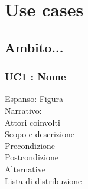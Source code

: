 \section{Use cases }
\subsection{Ambito...}
	\subsubsection{UC1 : Nome }
	
		Espanso: Figura\\
		Narrativo:\\
		Attori coinvolti\\
		Scopo e descrizione\\
		Precondizione\\
		Postcondizione\\
		Alternative\\
		Lista di distribuzione\\